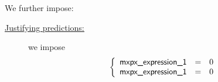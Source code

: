 We further impose:
\begin{description}
	\item[\underline{\underline{Justifying \hubMod{} predictions:}}]
		we impose
		\[
			\left\{ \begin{array}{lcl}
				\textsf{mxpx\_expression\_1} & = & 0 \\
				\textsf{mxpx\_expression\_1} & = & 0 \\
			\end{array} \right.
		\]
\end{description}


